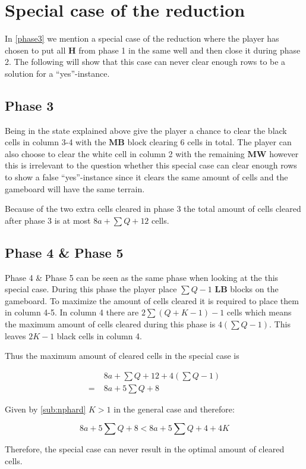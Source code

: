 \section{Special case of the reduction}
\label{specialcasereduction}

In \ref{phase3} we mention a special case of the reduction where the player has chosen to put all $\mathbf{H}$ from phase 1 in the same well and then close it during phase 2. The following will show that this case can never clear enough rows to be a solution for a ``yes''-instance.

\subsection*{Phase 3}
Being in the state explained above give the player a chance to clear the black cells in column 3-4 with the $\mathbf{MB}$ block clearing 6 cells in total. The player can also choose to clear the white cell in column 2 with the remaining $\mathbf{MW}$ however this is irrelevant to the question whether this special case can clear enough rows to show a false ``yes''-instance since it clears the same amount of cells and the gameboard will have the same terrain.

Because of the two extra cells cleared in phase 3 the total amount of cells cleared after phase 3 is at most $8a + \sum Q + 12$ cells.

\subsection*{Phase 4 \& Phase 5}

Phase 4 \& Phase 5 can be seen as the same phase when looking at the this special case. During this phase the player place $\sum Q - 1$ $\mathbf{LB}$ blocks on the gameboard. To maximize the amount of cells cleared it is required to place them in column 4-5. In column 4 there are $2 \sum \left( Q + K - 1 \right) - 1$ cells which means the maximum amount of cells cleared during this phase is $ 4 \left( \sum Q - 1 \right)$. This leaves $2K-1$ black cells in column 4.

Thus the maximum amount of cleared cells in the special case is

\begin{align*}
  & 8a + \sum Q + 12 + 4 \left( \sum Q - 1 \right) \\
= \; & 8a + 5 \sum Q + 8
\end{align*}

Given by \ref{sub:nphard} $K > 1$ in the general case and therefore: 

\begin{equation*}
8a + 5 \sum Q + 8 < 8a + 5 \sum Q + 4 + 4K
\end{equation*}

Therefore, the special case can never result in the optimal amount of cleared cells.
